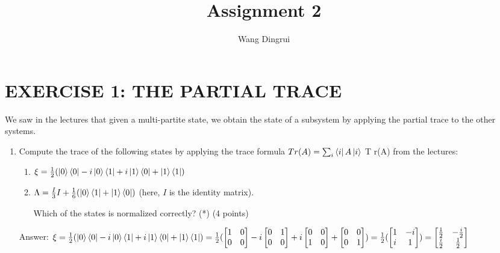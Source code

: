 \documentclass{article}
\title{Assignment 2}
\author{Wang Dingrui}
\begin{document}
\maketitle

\section{EXERCISE 1: THE PARTIAL TRACE}

We saw in the lectures that given a multi-partite state, we obtain the state of a subsystem by applying the partial trace to the other systems.

\begin{enumerate}
    \item Compute the trace of the following states by applying the trace formula $ Tr(A)=\sum_i\bra{i}A\ket{i} $ T r(A) from the lectures:
          \begin{enumerate}
              \item $\xi = \frac{1}{2}(\ket{0}\bra{0} - i\ket{0}\bra{1} + i\ket{1}\bra{0} + \ket{1}\bra{1})$
              \item $\Lambda = \frac{I}{3}I + \frac{1}{6}(\ket{0}\bra{1} + \ket{1}\bra{0})$ (here, $I$ is the identity matrix).

                    Which of the states is normalized correctly? (*) (4 points)
          \end{enumerate}
          Answer: $\xi = \frac{1}{2}(\ket{0}\bra{0} - i\ket{0}\bra{1} + i\ket{1}\bra{0} + \ket{1}\bra{1})
              \\= \frac{1}{2}(\begin{bmatrix}
                  1 & 0 \\
                  0 & 0
              \end{bmatrix} - i\begin{bmatrix}
                  0 & 1 \\
                  0 & 0
              \end{bmatrix} + i\begin{bmatrix}
                  0 & 0 \\
                  1 & 0
              \end{bmatrix} + \begin{bmatrix}
                  0 & 0 \\
                  0 & 1
              \end{bmatrix})
              \\= \frac{1}{2}(\begin{bmatrix}
                  1 & -i \\
                  i & 1
              \end{bmatrix})
              \\= \begin{bmatrix}
                  \frac{1}{2} & -\frac{i}{2} \\
                  \frac{i}{2} & \frac{1}{2}
              \end{bmatrix}$


\end{enumerate}
\end{document}
